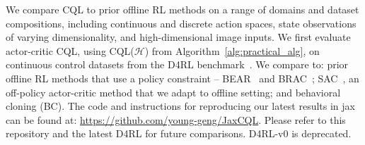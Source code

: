 We compare CQL to prior offline RL methods on a range of domains and dataset compositions, including continuous and discrete action spaces, state observations of varying dimensionality, and high-dimensional image inputs. We first evaluate actor-critic CQL, using CQL($\mathcal{H}$) from Algorithm~\ref{alg:practical_alg}, on continuous control datasets from the D4RL benchmark~\citep{d4rl}.
We compare to: prior offline RL methods that use a policy constraint -- BEAR~\citep{kumar2019stabilizing} and BRAC~\citep{wu2019behavior}; SAC~\citep{haarnoja}, an off-policy actor-critic method that we adapt to offline setting; and behavioral cloning (BC). {The code and instructions for reproducing our latest results in jax can be found at: \url{https://github.com/young-geng/JaxCQL}. Please refer to this repository and the latest D4RL for future comparisons. D4RL-v0 is deprecated.}


